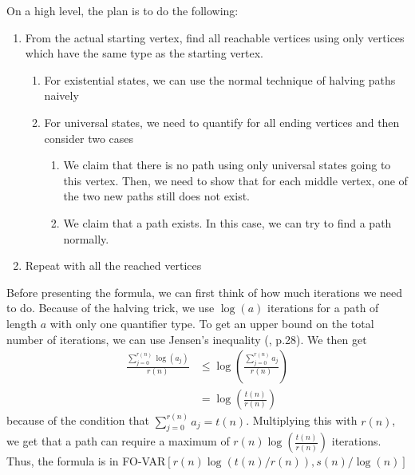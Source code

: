 On a high level, the plan is to do the following:
\begin{enumerate}
    \setlength\itemsep{0.2em}
    \item From the actual starting vertex, find all reachable vertices using only vertices which have the same type as the starting vertex.
    \begin{enumerate}
        \item For existential states, we can use the normal technique of halving paths naively
        \item For universal states, we need to quantify for all ending vertices and then consider two cases
        \begin{enumerate}
            \item We claim that there is no path using only universal states going to this vertex.
            Then, we need to show that for each middle vertex, one of the two new paths still does not exist.
            \item We claim that a path exists.
            In this case, we can try to find a path normally.
        \end{enumerate}
    \end{enumerate}
    \item Repeat with all the reached vertices
\end{enumerate}

Before presenting the formula, we can first think of how much iterations we need to do.
Because of the halving trick, we use $\log(a)$ iterations for a path of length $a$ with only one quantifier type.
To get an upper bound on the total number of iterations, we can use Jensen's inequality (\cite{inequalities-math-oly}, p.28).
We then get
\[
    \begin{aligned}
        \frac{\sum_{j = 0}^{r(n)}\log(a_{j})}{r(n)} &\leq \log\left( \frac{\sum_{j= 0}^{r(n)}a_{j}}{r(n)} \right)  \\
        &= \log\left( \frac{t(n)}{r(n)} \right)
    \end{aligned}
\]
because of the condition that $\sum_{j= 0}^{r(n)}a_{j} = t(n)$.
Multiplying this with $r(n)$, we get that a path can require a maximum of $r(n)\log\left( \frac{t(n)}{r(n)} \right)$ iterations.
Thus, the formula is in FO-VAR$\left[ r(n)\log\left( t(n)/r(n) \right), s(n)/\log(n) \right]$

